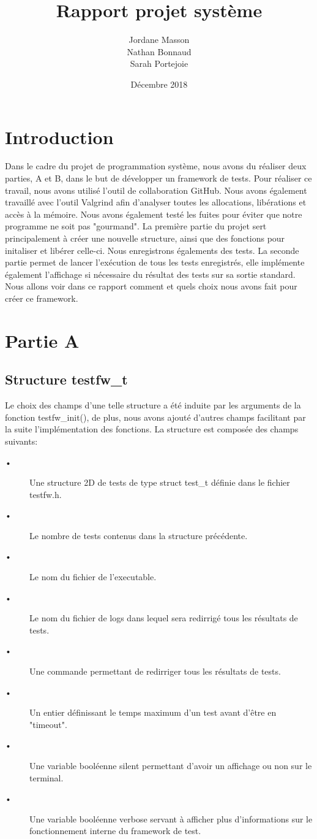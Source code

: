 \documentclass{article}
\title{Rapport projet système}
\author{Jordane Masson \\ Nathan Bonnaud \\ Sarah Portejoie}
\date{Décembre 2018}
\begin{document}
\maketitle

\section{Introduction}
Dans le cadre du projet de programmation système, nous avons du réaliser deux parties, A et B, dans le but de développer un framework de tests. Pour réaliser ce travail, nous avons utilisé l'outil de collaboration GitHub. Nous avons également travaillé avec l'outil Valgrind afin d'analyser toutes les allocations, libérations et accès à la mémoire. Nous avons également testé les fuites pour éviter que notre programme ne soit pas "gourmand".
La première partie du projet sert principalement à créer une nouvelle structure, ainsi que des fonctions pour initaliser et libérer celle-ci. Nous enregistrons égalements des tests. La seconde partie permet de lancer l'exécution de tous les tests enregistrés, elle implémente également l'affichage si nécessaire du résultat des tests sur sa sortie standard.
Nous allons voir dans ce rapport comment et quels choix nous avons fait pour créer ce framework.
    
   
\section{Partie A}   
\subsection{Structure testfw\_t}
Le choix des champs d'une telle structure a été induite par les arguments de la fonction testfw\_init(), de plus, 
 nous avons ajouté d'autres champs facilitant par la suite l'implémentation des fonctions. La structure est composée des champs suivants:
 \begin{description}
 \item[•] Une structure 2D de tests de type struct test\_t définie dans le fichier testfw.h. 
 \item[•] Le nombre de tests contenus dans la structure précédente.
 \item[•] Le nom du fichier de l'executable. 
 \item[•] Le nom du fichier de logs dans lequel sera redirrigé tous les résultats de tests.
 \item[•] Une commande  permettant de redirriger tous les résultats de tests.
 \item[•] Un entier définissant le temps maximum d'un test avant d'être en "timeout".
 \item[•] Une variable booléenne silent permettant d'avoir un affichage ou non sur le terminal. 
 \item[•] Une variable booléenne verbose servant à afficher plus d'informations sur le fonctionnement interne du framework de test.
\end{description}
\end{document}
